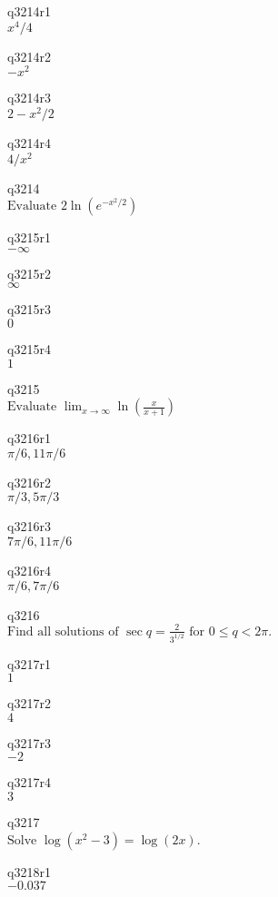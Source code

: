 q3214r1\\
\(\displaystyle x^4/4 \)

q3214r2\\
\(\displaystyle -x^2 \)

q3214r3\\
\(\displaystyle 2-x^2/2 \)

q3214r4\\
\(\displaystyle 4/x^2 \)

q3214\\
\(\displaystyle \text{Evaluate } 2\ln (e^{-x^2/2}) \)

q3215r1\\
\(\displaystyle -\infty \)

q3215r2\\
\(\displaystyle \infty \)

q3215r3\\
\(\displaystyle 0 \)

q3215r4\\
\(\displaystyle 1 \)

q3215\\
\(\displaystyle \text{Evaluate } \lim_{x \rightarrow \infty} \ln \left ( \frac{x}{x+1} \right ) \)

q3216r1\\
\(\displaystyle \pi/6, 11\pi/6 \)

q3216r2\\
\(\displaystyle \pi/3, 5\pi/3 \)

q3216r3\\
\(\displaystyle 7\pi/6, 11\pi/6 \)

q3216r4\\
\(\displaystyle \pi/6, 7\pi/6 \)

q3216\\
\(\displaystyle \text{Find all solutions of } \sec q = \frac{2}{3^{1/2}} \text{ for } 0 \leq q < 2\pi. \)

q3217r1\\
\(\displaystyle 1 \)

q3217r2\\
\(\displaystyle 4 \)

q3217r3\\
\(\displaystyle -2 \)

q3217r4\\
\(\displaystyle 3 \)

q3217\\
\(\displaystyle \text{Solve } \log(x^2 - 3) = \log(2x). \)

q3218r1\\
\(\displaystyle -0.037 \)


